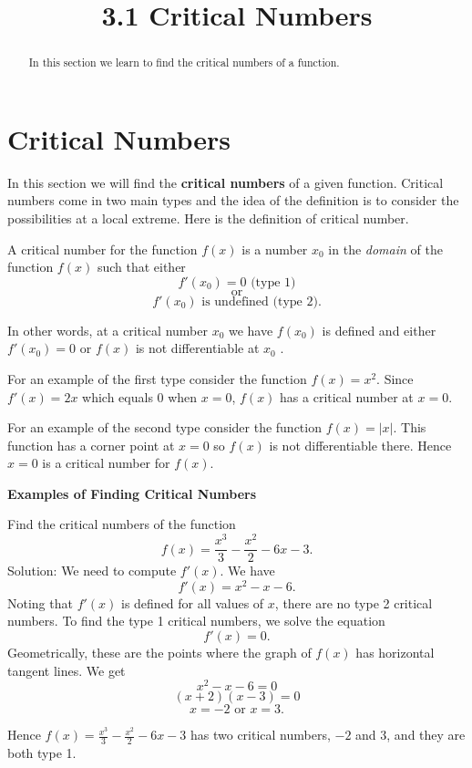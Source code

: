 \documentclass{ximera}
\title{3.1 Critical Numbers}
\begin{document}
\begin{abstract}
In this section we learn to find the critical numbers of a function.
\end{abstract}

\maketitle









\section{Critical Numbers}

In this section we will find the {\bf critical numbers} of a given function. Critical numbers come in two main types and the idea of the definition is to consider the possibilities at a local extreme. Here is the definition of  critical number.  \\



\begin{definition}
A critical number for the function $f(x)$ is a number 
$x_0$ in the {\it domain} of the function $f(x)$ such that either
\[f'(x_0) = 0 \text{  (type 1)}\]
\[ \text{or} \]
\[f'(x_0)  \text{   is undefined  (type 2)}.\]
\end{definition}
In other words, at a critical number $x_0$ we have  $f(x_0)$ is defined and either $f'(x_0) = 0$ or
$f(x)$ is not differentiable at $x_0$ .

For an example of the first type  consider the function $f(x) = x^2$.   
Since $f'(x) = 2x$ which equals 0 when $x = 0$,
$f(x)$ has a critical number at $x = 0$.

For an example of the second type consider the function $f(x) = |x|$. This function has a corner point at $x = 0$
so $f(x)$ is not differentiable there. Hence $x=0$ is a critical number for $f(x)$.



\begin{center}
{\bf Examples of Finding Critical Numbers}
\end{center}


\begin{example}[example 1] Find the critical numbers of the function 
\[f(x) = \dfrac{x^3}{3} - \dfrac{x^2}{2} - 6x - 3.\]
Solution: We need to compute $f'(x)$.  We have
\[f'(x) = x^2 - x - 6.\]
Noting that $f'(x)$ is defined for all values of $x$, there are no type 2 critical numbers.
To find the type 1 critical numbers, we solve the equation
\[f'(x) = 0.\]
Geometrically, these are the points where the graph of $f(x)$ has horizontal tangent lines.
We get
\[ x^2 - x - 6 =0\]
\[ (x+2)(x-3) =0\]
\[x = -2 \mbox{  or  } x = 3.\]

Hence $f(x) = \frac{x^3}{3} - \frac{x^2}{2} - 6x - 3$ has two critical numbers, $-2$ and $3$, and they are both type 1.
\end{example}
\end{document}

